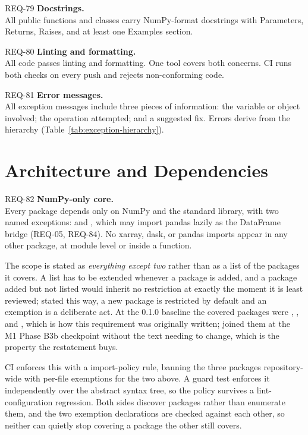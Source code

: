 \begin{reqbox}{REQ-79}{\stable}
\textbf{Docstrings.}\\
All public functions and classes carry NumPy-format docstrings with
Parameters, Returns, Raises, and at least one Examples section.
\end{reqbox}

\begin{reqbox}{REQ-80}{\stable}
\textbf{Linting and formatting.}\\
All code passes  linting and 
formatting. One tool covers both concerns. CI runs both checks on every
push and rejects non-conforming code.
\end{reqbox}

\begin{reqbox}{REQ-81}{\stable}
\textbf{Error messages.}\\
All exception messages include three pieces of information: the variable
or object involved; the operation attempted; and a suggested fix. Errors
derive from the  hierarchy
(Table~\ref{tab:exception-hierarchy}).
\end{reqbox}

\section{Architecture and Dependencies}

\begin{reqbox}{REQ-82}{\stable}
\textbf{NumPy-only core.}\\
Every \itc{} package depends only on NumPy and the standard library,
with two named exceptions:  and , which may
import pandas lazily as the DataFrame bridge (REQ-05, REQ-84). No
xarray, dask, or pandas imports appear in any other package, at module
level or inside a function.

The scope is stated as \emph{everything except two} rather than as a
list of the packages it covers. A list has to be extended whenever a
package is added, and a package added but not listed would inherit no
restriction at exactly the moment it is least reviewed; stated this
way, a new package is restricted by default and an exemption is a
deliberate act. At the 0.1.0 baseline the covered packages were
, , and , which is how this
requirement was originally written;  joined them at the M1
Phase B3b checkpoint without the text needing to change, which is the
property the restatement buys.

CI enforces this with a  import-policy rule, banning the
three packages repository-wide with per-file exemptions for the two
above. A guard test enforces it independently over the abstract syntax
tree, so the policy survives a lint-configuration regression. Both
sides discover packages rather than enumerate them, and the two
exemption declarations are checked against each other, so neither can
quietly stop covering a package the other still covers.
\end{reqbox}

